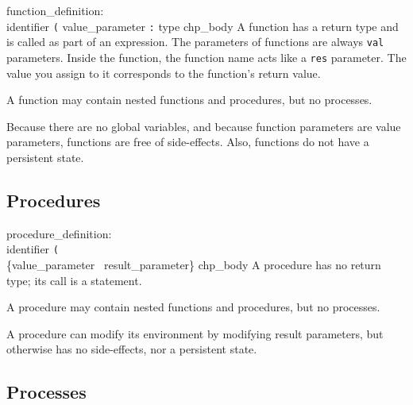 \grammarstart
function\_definition: \\
       identifier {\tt{}(} value\_parameter\SEQ {\tt{})} {\tt{}:} type chp\_body
\grammarend
A function has a return type and is called as part of an expression.
The parameters of functions are always {\tt{}val} parameters. Inside the
function, the function name acts like a {\tt{}res} parameter. The value
you assign to it corresponds to the function's return value.

A function may contain nested functions and procedures, but no processes.

Because there are no global variables, and because function parameters
are value parameters, functions are free of side-effects. Also, functions
do not have a persistent state.


\subsection{Procedures}\label{sec:procedure}

\grammarstart
procedure\_definition: \\
       identifier {\tt{}(} \\
      \>\qquad\{value\_parameter \orbox \ result\_parameter\}\SEQOPT {\tt{})} chp\_body
\grammarend
A procedure has no return type; its call is a statement.

A procedure may contain nested functions and procedures, but no processes.

A procedure can modify its environment by modifying result parameters,
but otherwise has no side-effects, nor a persistent state.


\subsection{Processes}\label{sec:process}

